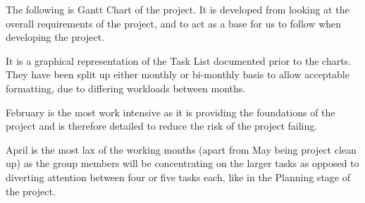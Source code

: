 
The following is Gantt Chart of the project. It is developed from looking at 
the overall requirements of the project, and to act as a base for us to follow 
when developing the project.

It is a graphical representation of the Task List documented prior to the 
charts.  They have been split up either monthly or bi-monthly basis to allow 
acceptable formatting, due to differing workloads between months.

February is the most work intensive as it is providing the foundations of the
project and is therefore detailed to reduce the risk of the project failing.

April is the most lax of the working months (apart from May being project
clean up) as the group members will be concentrating on the larger tasks as
opposed to diverting attention between four or five tasks each, like in the
Planning stage of the project.

